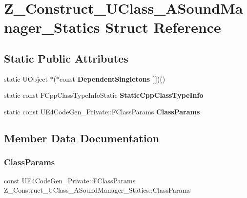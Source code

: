 \hypertarget{struct_z___construct___u_class___a_sound_manager___statics}{}\section{Z\+\_\+\+Construct\+\_\+\+U\+Class\+\_\+\+A\+Sound\+Manager\+\_\+\+Statics Struct Reference}
\label{struct_z___construct___u_class___a_sound_manager___statics}
\subsection*{Static Public Attributes}
\begin{DoxyCompactItemize}
\item 
\mbox{\label{struct_z___construct___u_class___a_sound_manager___statics_a7a1e278b26e4e84b11f42adc84cbb893}} 
static U\+Object $\ast$($\ast$const {\bfseries Dependent\+Singletons} \mbox{[}$\,$\mbox{]})()
\item 
static const F\+Cpp\+Class\+Type\+Info\+Static {\bfseries Static\+Cpp\+Class\+Type\+Info}
\item 
static const U\+E4\+Code\+Gen\+\_\+\+Private\+::\+F\+Class\+Params {\bfseries Class\+Params}
\end{DoxyCompactItemize}


\subsection{Member Data Documentation}
\mbox{\label{struct_z___construct___u_class___a_sound_manager___statics_a5edf3c7c155f00cef9232da9b59bb37d}} 
\subsubsection{\texorpdfstring{ClassParams}{ClassParams}}
{\footnotesize\ttfamily const U\+E4\+Code\+Gen\+\_\+\+Private\+::\+F\+Class\+Params Z\+\_\+\+Construct\+\_\+\+U\+Class\+\_\+\+A\+Sound\+Manager\+\_\+\+Statics\+::\+Class\+Params\hspace{0.3cm}{\ttfamily [static]}}

